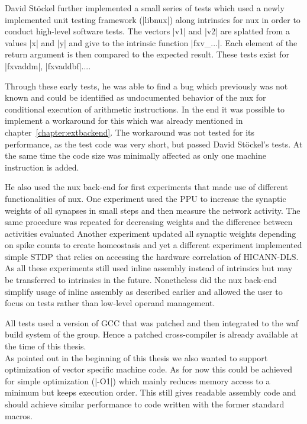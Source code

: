 David Stöckel further implemented a small series of tests which used a newly implemented unit testing framework (|libnux|) along intrinsics for nux in order to conduct high-level software tests.
The vectors |v1| and |v2| are splatted from a values |x| and |y| and give to the intrinsic function |fxv_...|.
Each element of the return argument is then compared to the expected result.
These tests exist for |fxvaddm|, |fxvaddbf|....

Through these early tests, he was able to find a bug which previously was not known and could be identified as undocumented behavior of the nux for conditional execution of arithmetic instructions.
In the end it was possible to implement a workaround for this which was already mentioned in chapter~\ref{chapter:extbackend}.
The workaround was not tested for its performance, as the test code was very short, but passed David Stöckel's tests.
At the same time the code size was minimally affected as only one machine instruction is added.

He also used the nux back-end for first experiments that made use of different functionalities of nux.
One experiment used the \ac{PPU} to increase the synaptic weights of all synapses in small steps and then measure the network activity.
The same procedure was repeated for decreasing weights and the difference between activities evaluated
Another experiment updated all synaptic weights depending on spike counts to create homeostasis and yet a different experiment implemented simple \ac{STDP} that relies on accessing the hardware correlation of \ac{HICANN-DLS}.
As all these experiments still used inline assembly instead of intrinsics but may be transferred to intrinsics in the future.
Nonetheless did the nux back-end simplify usage of inline assembly as described earlier and allowed the user to focus on tests rather than low-level operand management.

All tests used a version of GCC that was patched and then integrated to the waf build system of the group.
Hence a patched cross-compiler is already available at the time of this thesis.
\\
As pointed out in the beginning of this thesis we also wanted to support optimization of vector specific machine code.
As for now this could be achieved for simple optimization (|-O1|) which mainly reduces memory access to a minimum but keeps execution order.
This still gives readable assembly code and should achieve similar performance to code written with the former standard macros.

